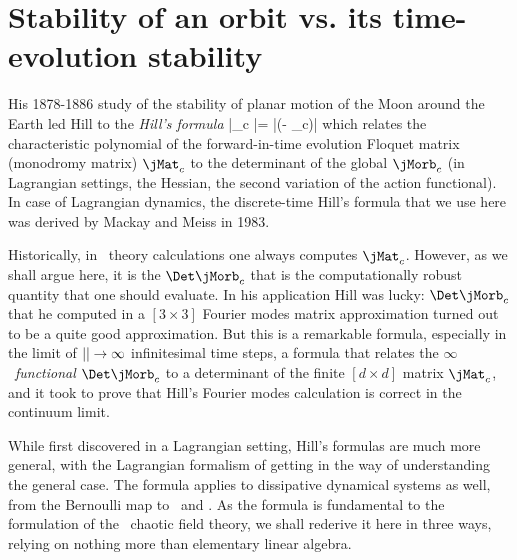 
\renewcommand{\statesp}{state space}
\renewcommand{\Statesp}{State space}
\renewcommand{\stateDsp}{state-space}
\renewcommand{\StateDsp}{State-space}

\section{%
         Stability of an orbit vs. its time-evolution stability}
\label{s:LC21Hill}

His 1878-1886 study of the stability of planar motion of the Moon around
the Earth led  Hill to the \emph{Hill's formula}
\beq
\left|\Det\jMorb_c \right|= \left|\det (\id - \jMat_c)\right|
which relates the characteristic polynomial of the for\-ward-in-time
evolution {\po} Floquet matrix (monodromy matrix) $\jMat_c$ to the
determinant of the global {\jacobianOrb} $\jMorb_c$ (in Lagrangian
settings, the Hessian, the second variation of the action functional).
In case of Lagrangian dynamics, the discrete-time Hill's formula that we
use here was derived  by Mackay and Meiss in 1983.

Historically,  in \po\ theory calculations one always computes $\jMat_c$.
However, as we shall argue here, it is the {\HillDet} $\Det\jMorb_c$ that
is the computationally robust quantity that one should evaluate.
In his application Hill was lucky: $\Det\jMorb_c$ that he computed in a
$[3\!\times\!3]$ Fourier modes matrix approximation turned out to be a
quite good approximation.
But this is a remarkable formula, especially in the limit of
${||}\to\infty$ infinitesimal time steps, a formula that relates the
$\infty$\dmn\ \emph{functional} {\HillDet} $\Det\jMorb_c$ to a
determinant of the finite $[d\!\times\!d]$ matrix $\jMat_c$, and it took
\Poincare{} to prove that Hill's Fourier modes calculation is
correct in the continuum limit.

While first discovered in a Lagrangian setting, Hill's formulas are much
more general, with the Lagrangian formalism of
 getting in the way of
understanding the general case.
The formula applies to dissipative dynamical systems as well, from the
Bernoulli map to \NS\ and \KSe{}. As the formula
is fundamental to the formulation of the \spt\ chaotic field theory, we
shall rederive it here in three ways, relying on nothing more than
elementary linear algebra.

